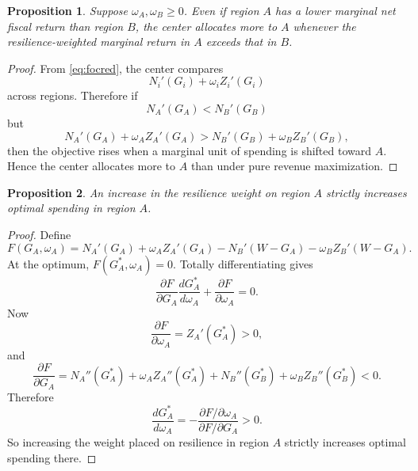 \documentclass[12pt]{article}
\newtheorem{proposition}{Proposition}
\begin{document}
\begin{proposition}
Suppose $\omega_A,\omega_B \ge 0$. Even if region $A$ has a lower marginal net fiscal return than region $B$, the center allocates more to $A$ whenever the resilience-weighted marginal return in $A$ exceeds that in $B$.
\end{proposition}

\begin{proof}
From \eqref{eq:focred}, the center compares
\begin{equation}
N_i'(G_i) + \omega_i Z_i'(G_i)
\end{equation}
across regions. Therefore if
\begin{equation}
N_A'(G_A) < N_B'(G_B)
\end{equation}
but
\begin{equation}
N_A'(G_A) + \omega_A Z_A'(G_A) > N_B'(G_B) + \omega_B Z_B'(G_B),
\end{equation}
then the objective rises when a marginal unit of spending is shifted toward $A$. Hence the center allocates more to $A$ than under pure revenue maximization.\qedhere
\end{proof}

\begin{proposition}
An increase in the resilience weight on region $A$ strictly increases optimal spending in region $A$.
\end{proposition}

\begin{proof}
Define
\begin{equation}
F(G_A,\omega_A) = N_A'(G_A) + \omega_A Z_A'(G_A) - N_B'(W-G_A) - \omega_B Z_B'(W-G_A).
\end{equation}
At the optimum, $F(G_A^*,\omega_A)=0$. Totally differentiating gives
\begin{equation}
\frac{\partial F}{\partial G_A}\frac{dG_A^*}{d\omega_A} + \frac{\partial F}{\partial \omega_A} = 0.
\end{equation}
Now
\begin{equation}
\frac{\partial F}{\partial \omega_A} = Z_A'(G_A^*) > 0,
\end{equation}
and
\begin{equation}
\frac{\partial F}{\partial G_A} = N_A''(G_A^*) + \omega_A Z_A''(G_A^*) + N_B''(G_B^*) + \omega_B Z_B''(G_B^*) < 0.
\end{equation}
Therefore
\begin{equation}
\frac{dG_A^*}{d\omega_A} = -\frac{\partial F/\partial \omega_A}{\partial F/\partial G_A} > 0.
\end{equation}
So increasing the weight placed on resilience in region $A$ strictly increases optimal spending there.\qedhere
\end{proof}
\end{document}
